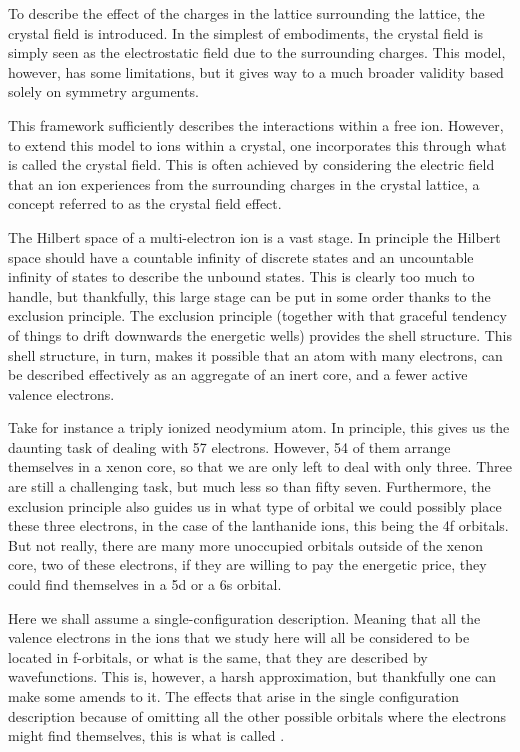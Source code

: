 \documentclass{article}
\begin{document}
To describe the effect of the charges in the lattice surrounding the lattice, the crystal field is introduced. In the simplest of embodiments, the crystal field is simply seen as the electrostatic field due to the surrounding charges. This model, however, has some limitations, but it gives way to a much broader validity based solely on symmetry arguments.

This framework sufficiently describes the interactions within a free ion. However, to extend this model to ions within a crystal, one incorporates this through what is called the crystal field. This is often achieved by considering the electric field that an ion experiences from the surrounding charges in the crystal lattice, a concept referred to as the crystal field effect.

The Hilbert space of a multi-electron ion is a vast stage. In principle the Hilbert space should have a countable infinity of discrete states and an uncountable infinity of states to describe the unbound states. This is clearly too much to handle, but thankfully, this large stage can be put in some order thanks to the exclusion principle. The exclusion principle (together with that graceful tendency of things to drift downwards the energetic wells) provides the shell structure. This shell structure, in turn, makes it possible that an atom with many electrons, can be described effectively as an aggregate of an inert core, and a fewer active valence electrons.  

Take for instance a triply ionized neodymium atom. In principle, this gives us the daunting task of dealing with 57 electrons. However, 54 of them arrange themselves in a xenon core, so that we are only left to deal with only three. Three are still a challenging task, but much less so than fifty seven. Furthermore, the exclusion principle also guides us in what type of orbital we could possibly place these three electrons, in the case of the lanthanide ions, this being the 4f orbitals. But not really, there are many more unoccupied orbitals outside of the xenon core, two of these electrons, if they are willing to pay the energetic price, they could find themselves in a 5d or a 6s orbital.  

Here we shall assume a single-configuration description. Meaning that all the valence electrons in the ions that we study here will all be considered to be located in f-orbitals, or what is the same, that they are described by \fn wavefunctions. This is, however, a harsh approximation, but thankfully one can make some amends to it. The effects that arise in the single configuration description because of omitting all the other possible orbitals where the electrons might find themselves, this is what is called \confint.  
\end{document}
